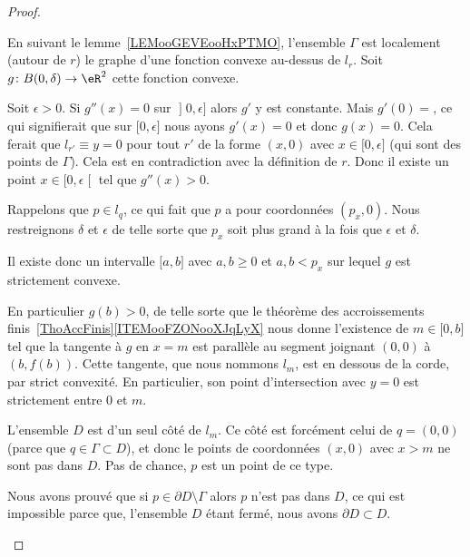 \begin{proof}
\begin{subproof}
		 En suivant le lemme~\ref{LEMooGEVEooHxPTMO}, l'ensemble \( \Gamma\) est localement (autour de \( r\)) le graphe d'une fonction convexe au-dessus de \( l_r\). Soit \( g\colon B(0,\delta)\to \eR^2\) cette fonction convexe.

		Soit \( \epsilon>0\). Si \( g''(x)=0\) sur \( \mathopen] 0 , \epsilon \mathclose]\) alors \( g'\) y est constante. Mais \( g'(0)=\), ce qui signifierait que sur \( \mathopen[ 0 , \epsilon \mathclose]\) nous ayons \( g'(x)=0\) et donc \( g(x)=0\). Cela ferait que \( l_{r'}\equiv y=0\) pour tout \( r'\) de la forme \( (x,0)\) avec \( x\in \mathopen[ 0 , \epsilon \mathclose]\) (qui sont des points de \( \Gamma\)). Cela est en contradiction avec la définition de \( r\). Donc il existe un point \(x\in \mathopen[ 0 , \epsilon \mathclose[\) tel que \( g''(x)>0\).

		Rappelons que \( p\in l_q\), ce qui fait que \( p\) a pour coordonnées \( (p_x,0)\). Nous restreignons \( \delta\) et \( \epsilon\) de telle sorte que \( p_x\) soit plus grand à la fois que \( \epsilon\) et \(\delta\).

		Il existe donc un intervalle \( \mathopen[ a , b \mathclose]\) avec \( a,b\geq 0\) et \( a,b<p_x\) sur lequel \( g\) est strictement convexe.


		En particulier \( g(b)>0\), de telle sorte que le théorème des accroissements finis~\ref{ThoAccFinis}\ref{ITEMooFZONooXJqLyX} nous donne l'existence de \( m\in\mathopen[ 0 , b \mathclose]\) tel que la tangente à \( g\) en \( x=m\) est parallèle au segment joignant \( (0,0)\) à \( (b,f(b))\). Cette tangente, que nous nommons \( l_m\), est en dessous de la corde, par strict convexité. En particulier, son point d'intersection avec \( y=0\) est strictement entre \( 0\) et \( m\).

		L'ensemble \( D\) est d'un seul côté de \(l_m\). Ce côté est forcément celui de \( q=(0,0)\) (parce que \( q\in \Gamma\subset D\)), et donc le points de coordonnées \( (x,0)\) avec \( x>m\) ne sont pas dans \(D\). Pas de chance, \( p\) est un point de ce type.

		\spitem[La contradiction]
		Nous avons prouvé que si \( p\in \partial D\setminus \Gamma\) alors \( p\) n'est pas dans \( D\), ce qui est impossible parce que, l'ensemble \( D\) étant fermé, nous avons \( \partial D\subset D\).
	\end{subproof}
\end{proof}

